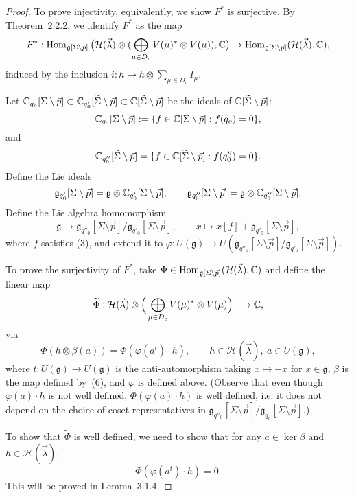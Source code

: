\documentclass[12pt]{article}
\begin{document}
\begin{proof}
To prove injectivity, equivalently, we show $F^*$ is surjective. By Theorem~2.2.2, we identify $F^*$ as the map
\[
F^* : \operatorname{Hom}_{\mathfrak g[\Sigma\setminus\vec p]}\big(\mathcal H(\vec\lambda)\otimes (\bigoplus_{\mu\in D_c}V(\mu)^*\otimes V(\mu)),\mathbb{C}\big)
\to \operatorname{Hom}_{\mathfrak g[\Sigma\setminus\vec p]}(\mathcal H(\vec\lambda),\mathbb{C}),
\]
induced by the inclusion $i:h\mapsto h\otimes\sum_{\mu\in D_c}I_\mu$.

Let $\mathbb{C}_{q_o}[\Sigma\setminus\vec p]\subset \mathbb{C}_{q'_0}[\widetilde\Sigma\setminus\vec p]\subset\mathbb{C}[\widetilde\Sigma\setminus\vec p]$ be the ideals of $\mathbb{C}[\widetilde\Sigma\setminus\vec p]$:
\[
\mathbb{C}_{q_o}[\Sigma\setminus\vec p]:=\{f\in\mathbb{C}[\Sigma\setminus\vec p]:f(q_o)=0\},
\]
and
\[
\mathbb{C}_{q''_0}[\widetilde\Sigma\setminus\vec p]=\{f\in\mathbb{C}[\widetilde\Sigma\setminus\vec p]:f(q''_0)=0\}.
\]Define the Lie ideals
\[
\mathfrak g_{q'_0}[\Sigma\setminus\vec p]=\mathfrak g\otimes\mathbb{C}_{q'_0}[\Sigma\setminus\vec p],
\qquad
\mathfrak g_{q''_0}[\Sigma\setminus\vec p]=\mathfrak g\otimes\mathbb{C}_{q''_0}[\Sigma\setminus\vec p].
\]
Define the Lie algebra homomorphism
\[
\mathfrak g \to \mathfrak g_{q''_0}[\Sigma\setminus\vec p]/\mathfrak g_{q'_0}[\Sigma\setminus\vec p],
\qquad x\mapsto x[f]+\mathfrak g_{q'_0}[\Sigma\setminus\vec p],
\]
where $f$ satisfies (3), and extend it to $\varphi:U(\mathfrak g)\to U(\mathfrak g_{q''_0}[\Sigma\setminus\vec p]/\mathfrak g_{q'_0}[\Sigma\setminus\vec p])$.

\noindent To prove the surjectivity of $F^*$, take $\Phi\in\operatorname{Hom}_{\mathfrak g[\Sigma\setminus\vec p]}(\mathcal H(\vec\lambda),\mathbb{C})$ and define the linear map
\[
\widetilde\Phi: \mathcal H(\vec\lambda)\otimes\Big(\bigoplus_{\mu\in D_c}V(\mu)^*\otimes V(\mu)\Big)\longrightarrow\mathbb{C},
\]
via
\[
\widetilde\Phi(h\otimes\beta(a))=\Phi(\varphi(a^t)\cdot h),\qquad h\in\mathcal H(\vec\lambda),\ a\in U(\mathfrak g),
\]
where $t:U(\mathfrak g)\to U(\mathfrak g)$ is the anti-automorphism taking $x\mapsto -x$ for $x\in\mathfrak g$, $\beta$ is the map defined by~(6), and $\varphi$ is defined above. (Observe that even though $\varphi(a)\cdot h$ is not well defined, $\Phi(\varphi(a)\cdot h)$ is well defined, i.e. it does not depend on the choice of coset representatives in $\mathfrak g_{q''_0}[\widetilde\Sigma\setminus\vec p]/\mathfrak g_{q_o}[\Sigma\setminus\vec p]$.)

To show that $\widetilde\Phi$ is well defined, we need to show that for any $a\in\ker\beta$ and $h\in\mathcal H(\vec\lambda)$,
\begin{equation}
\Phi(\varphi(a^t)\cdot h)=0.
\tag{8}
\end{equation}
This will be proved in Lemma~3.1.4.


\end{proof}
\end{document}
